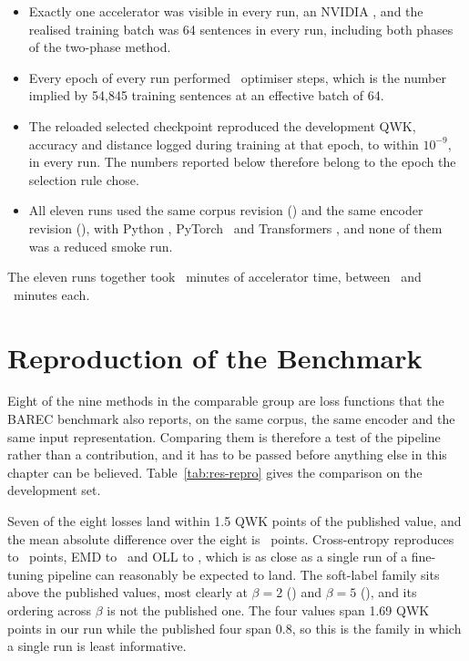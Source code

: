 \begin{itemize}
\item Exactly one accelerator was visible in every run, an NVIDIA \gpuName, and the realised
training batch was 64 sentences in every run, including both phases of the two-phase method.
\item Every epoch of every run performed \stepsPerEpoch\ optimiser steps, which is the number
implied by 54{,}845 training sentences at an effective batch of 64.
\item The reloaded selected checkpoint reproduced the development QWK, accuracy and distance
logged during training at that epoch, to within $10^{-9}$, in every run. The numbers reported
below therefore belong to the epoch the selection rule chose.
\item All eleven runs used the same corpus revision (\datasetSha) and the same encoder revision
(\modelSha), with Python \pythonVersion, PyTorch \torchVersion\ and Transformers \tfVersion,
and none of them was a reduced smoke run.
\end{itemize}

The eleven runs together took \totalMinutes\ minutes of accelerator time, between \minAll\ and
\maxAll\ minutes each.

\section{Reproduction of the Benchmark}
\label{sec:res-repro}

Eight of the nine methods in the comparable group are loss functions that the BAREC benchmark
also reports, on the same corpus, the same encoder and the same input representation. Comparing
them is therefore a test of the pipeline rather than a contribution, and it has to be passed
before anything else in this chapter can be believed.
Table~\ref{tab:res-repro} gives the comparison on the development set.



Seven of the eight losses land within 1.5 QWK points of the published value, and the mean
absolute difference over the eight is \gapQwkMean\ points. Cross-entropy reproduces to
\gapQwkCE\ points, EMD to \gapQwkEMD\ and OLL to \gapQwkOLL, which is as close as a single run
of a fine-tuning pipeline can reasonably be expected to land. The soft-label family sits above
the published values, most clearly at $\beta=2$ (\gapQwkSoftTwo) and $\beta=5$
(\gapQwkSoftFive), and its ordering across $\beta$ is not the published one. The four values
span 1.69 QWK points in our run while the published four span 0.8, so this is the family in
which a single run is least informative.

